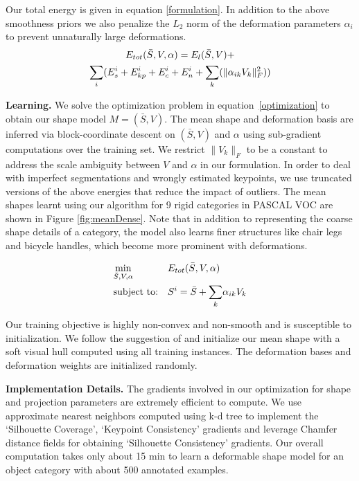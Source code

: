 Our total energy is given in equation \eqref{formulation}. In addition to the above smoothness priors we also penalize the $L_2$ norm of the deformation parameters $\alpha_i$ to prevent unnaturally large deformations.
\begin{multline}
\eqlabel{formulation}
E_{tot}(\bar{S},V,\alpha) = E_{l}(\bar{S},V)+\\
\underset{i}{\sum}(E_{s}^i+E_{kp}^i+E_{c}^i+E_{n}^i+\underset{k}{\sum}(\|\alpha_{ik}V_k\|_F^{2}))
\end{multline}

\vspace{3mm}
\noindent \textbf{Learning.} We solve the optimization problem in equation~\eqref{optimization} to obtain our shape model $M=(\bar{S},V)$. The mean shape and deformation basis are inferred via block-coordinate descent on $(\bar{S},V)$ and $\alpha$ using sub-gradient computations over the training set. We restrict $\|V_k\|_F$ to be a constant to address the scale ambiguity between $V$ and $\alpha$ in our formulation. In order to deal with imperfect segmentations and wrongly estimated keypoints, we use truncated versions of the above energies that reduce the impact of outliers. The mean shapes learnt using our algorithm for 9 rigid categories in PASCAL VOC are shown in Figure \ref{fig:meanDense}. Note that in addition to representing the coarse shape details of a category, the model also learns finer structures like chair legs and bicycle handles, which become more prominent with deformations.

\begin{equation}
\begin{aligned}
\eqlabel{optimization}
& \underset{\bar{S},V,\alpha}{\text{min}}
& & E_{tot}(\bar{S},V,\alpha) \\
& \text{subject to:}
& & S^i = \bar{S} + \underset{k}{\sum}\alpha_{ik} V_k
\end{aligned}
\end{equation}

Our training objective is highly non-convex and  non-smooth and is susceptible to initialization. We follow the suggestion of \cite{esteban2004snake} and initialize our mean shape with a soft visual hull computed using all training instances. The deformation bases and deformation weights are initialized randomly. 

\vspace{3mm}
\noindent \textbf{Implementation Details.}
The gradients involved in our optimization for shape and projection parameters are extremely efficient to compute. We use approximate nearest neighbors computed using k-d tree to implement the `Silhouette Coverage',  `Keypoint Consistency'  gradients and leverage Chamfer distance fields for obtaining `Silhouette Consistency' gradients. Our overall computation takes only about 15 min to learn a deformable shape model for an object category with about 500 annotated examples.

